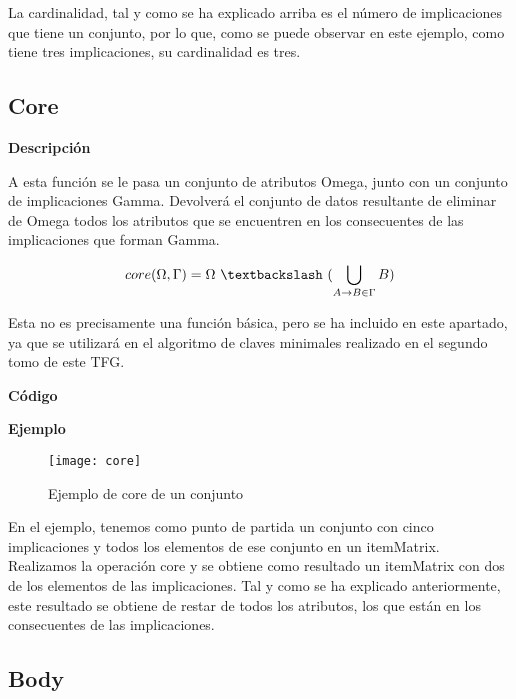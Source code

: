     La cardinalidad, tal y como se ha explicado arriba es el n\'umero de implicaciones que tiene un conjunto, por lo que, como 
    se puede observar en este ejemplo, como tiene tres implicaciones, su cardinalidad es tres.



\subsection{Core}

    \textbf{Descripci\'on}

    A esta funci\'on se le pasa un conjunto de atributos Omega, junto con un conjunto de implicaciones Gamma. 
    Devolver\'a el conjunto de datos resultante de eliminar de Omega todos los atributos que se encuentren en los 
    consecuentes de las implicaciones que forman Gamma. 

    \[
        core(\Omega , \Gamma ) = \Omega ~ \textbackslash ~ ( \bigcup_{A \to B \in \Gamma} B )    
    \]
    
    Esta no es precisamente una funci\'on b\'asica, pero se ha incluido en este apartado, ya que se utilizar\'a 
    en el algoritmo de claves minimales realizado en el segundo tomo de este TFG.
    \\

    \clearpage


    \textbf{C\'odigo}

    
    \bigskip

    \textbf{Ejemplo}


    \begin{figure}[H]
        \centering
        \texttt{[image: core]}
        \caption{Ejemplo de core de un conjunto}
        \label{fig:core}
    \end{figure}

    En el ejemplo, tenemos como punto de partida un conjunto con cinco implicaciones y todos los elementos de ese conjunto en 
    un itemMatrix. Realizamos la operaci\'on core y se obtiene como resultado un itemMatrix con dos de los elementos de las implicaciones. 
    Tal y como se ha explicado anteriormente, este resultado se obtiene de restar de todos los atributos, los que est\'an en los consecuentes 
    de las implicaciones.


    \clearpage

\subsection{Body}

